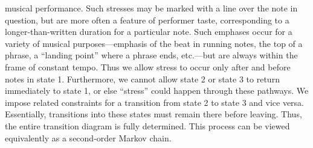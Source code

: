 \documentclass[aoas]{imsart}
\begin{document}
musical performance. Such stresses may be marked with a line over the
note in question, but are more often a feature of performer taste,
corresponding to a longer-than-written duration for a particular
note. Such emphases occur for a variety of musical purposes---emphasis
of the beat in running notes, the top of a
phrase, a ``landing point'' where a phrase ends, etc.---but are always
within the frame of constant tempo. Thus we allow stress to occur only
after and before notes in state 1. Furthermore, we cannot allow
state 2 or state 3 to return immediately to state 1, or else ``stress'' could
happen through these pathways. We impose related constraints for a transition from state 2
to state 3 and vice versa. Essentially, transitions into these states must remain
there before leaving. Thus, the entire transition diagram is
fully determined. This process can  be viewed equivalently as a
second-order Markov chain.
\end{document}
